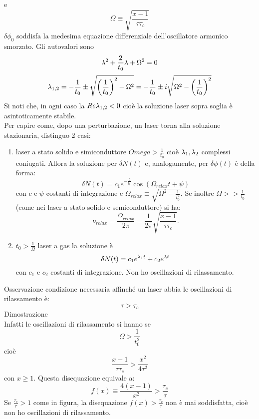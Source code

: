 e
\begin{equation*}
\Omega \equiv \sqrt{\frac{x-1}{\tau\tau_c}}
\end{equation*}
$\delta\phi_0$ soddisfa la medesima equazione differenziale dell'oscillatore armonico smorzato. Gli autovalori sono
\begin{equation*}
\lambda^2 + \frac{2}{t_0} \lambda + \Omega^2 = 0
\end{equation*}
\begin{equation*}
\lambda_{1,2} = -\frac{1}{t_0} \pm \sqrt{\left(\frac{1}{t_0}\right)^2 - \Omega^2} = -\frac{1}{t_0} \pm i\sqrt{\Omega^2 - \left(\frac{1}{t_0}\right)^2}
\end{equation*}
Si noti che, in ogni caso la $Re{\lambda_{1,2}} < 0$ cioè la soluzione laser sopra soglia è asintoticamente stabile.
\\
Per capire come, dopo una perturbazione, un laser torna alla soluzione stazionaria, distinguo 2 casi:
\begin{enumerate}
\item laser a stato solido e simiconduttore $Omega > \frac{1}{t_0}$ cioè $\lambda_1, \lambda_2$ complessi coniugati. Allora la soluzione per $\delta N(t)$ e, analogamente, per $\delta\phi(t)$ è della forma:
\begin{equation*}
\delta N(t) = c_1 e^{-\frac{t}{t_0}} \cos(\Omega_{relax} t + \psi)
\end{equation*}
con $c$ e $\psi$ costanti di integrazione e $\Omega_{relax} \equiv \sqrt{\Omega^2 - \frac{1}{t_0^2}}$. Se inoltre $\Omega >> \frac{1}{t_0}$ (come nei laser a stato solido e semiconduttore) si ha:
\begin{equation*}
\nu_{relax} = \frac{\Omega_{relax}}{2\pi} = \frac{1}{2\pi} \sqrt{\frac{x-1}{\tau\tau_c}}.
\end{equation*}
\item $t_0 > \frac{1}{\Omega}$ laser a gas
la soluzione è
\begin{equation*}
\delta N(t) = c_1 e^{\lambda_1 t} + c_2 e^{\lambda t}
\end{equation*}
con $c_1$ e $c_2$ costanti di integrazione. Non ho oscillazioni di rilassamento.
\end{enumerate}
Osservazione condizione necessaria affinché un laser abbia le oscillazioni di rilassamento è:
\begin{equation*}
\tau > \tau_c
\end{equation*}
Dimostrazione\\
Infatti le oscillazioni di rilassamento si hanno se
\begin{equation*}
\Omega > \frac{1}{t_0^2}
\end{equation*}
cioè
\begin{equation*}
\frac{x-1}{\tau\tau_c} > \frac{x^2}{4\tau^2}
\end{equation*}
con $x \geq 1$.
Questa disequazione equivale a:
\begin{equation*}
f(x) \equiv \frac{4 (x-1)}{x^2} > \frac{\tau_c}{\tau}
\end{equation*}
Se $\frac{\tau_c}{\tau} > 1$ come in figura, la disequazione $f(x) > \frac{\tau_c}{\tau}$ non è mai soddisfatta, cioè non ho oscillazioni di rilassamento.

